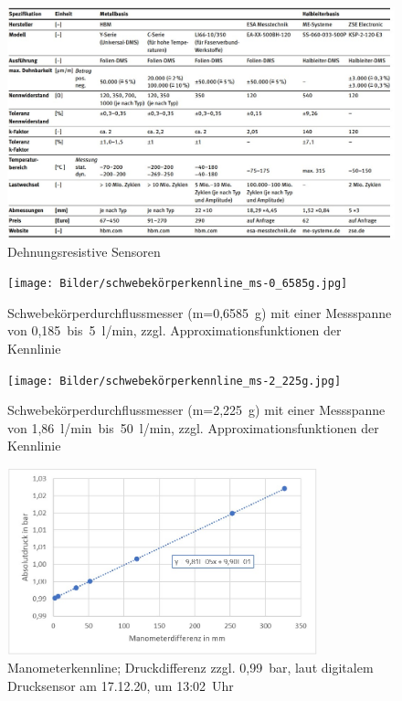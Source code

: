 \begin{figure}
\caption[]{Dehnungsresistive Sensoren}\label{fig:metall_halbleiter_dms} \vspace{1em}
\includegraphics[width=1\textwidth]{Bilder/Metall_Halbleiter_dms.jpg}
\vspace{0em}
 \end{figure}
 

 \begin{figure}[h!] %
 \centering
 \texttt{[image: Bilder/schwebekörperkennline\_ms-0\_6585g.jpg]}
 \vspace{0em}
  \caption[]{Schwebekörperdurchflussmesser (m=0,6585~g) mit einer Messspanne von 0,185~bis~5~l/min, zzgl. Approximationsfunktionen der Kennlinie}\label{fig:kleiner_skdm}
 \end{figure} 
 
 \begin{figure}[h!] %
 \centering
 \texttt{[image: Bilder/schwebekörperkennline\_ms-2\_225g.jpg]}
 \vspace{0em}
  \caption[]{Schwebekörperdurchflussmesser (m=2,225~g) mit einer Messspanne von 1,86~l/min~bis~50~l/min, zzgl. Approximationsfunktionen der Kennlinie}\label{fig:grosser_skdm}
 \end{figure}
 
 \begin{figure}[h!] %
 \centering
 \includegraphics[width=0.8\textwidth]{Bilder/manometer_plus_0-99_bar_atm.jpg}
 \vspace{0em}
  \caption[]{Manometerkennline; Druckdifferenz zzgl. 0,99~bar, laut digitalem Drucksensor am 17.12.20, um 13:02~Uhr}\label{fig:manometer_kennlinie}
 \end{figure}
 



